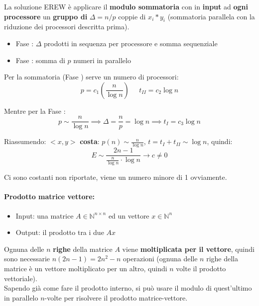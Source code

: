 \documentclass[11pt]{article}
\begin{document}
	La soluzione EREW è applicare il \textbf{modulo sommatoria} con in \textbf{input} ad \textbf{ogni processore} un \textbf{gruppo di} $\Delta = n/p$ coppie di $x_i \ast y_i$ (sommatoria parallela con la riduzione dei processori descritta prima).\\
	
	\begin{itemize}
		\item Fase : $\Delta$ prodotti in sequenza per processore e somma sequenziale
		\item Fase : somma di $p$ numeri in parallelo
	\end{itemize}
	
	Per la sommatoria (Fase ) serve un numero di processori: 
	$$ p = c_1 (\frac{n}{\log n}) \;\;\;\;\; t_{II} = c_2 \log n $$
	
	Mentre per la Fase : 
	$$ p \sim \frac{n}{\log n}  \implies \Delta = \frac{n}{p} = \log n \implies t_{I} = c_3 \log n$$
	
	Riassumendo:
	$<x,y>$ \textbf{costa}: $p(n) \sim \frac{n}{\log n}$, $t = t_{I} + t_{II} \sim \log n$, quindi:
	$$ E \sim \frac{2n-1}{\frac{n}{\log n} \cdot \log n} \rightarrow c \neq 0 $$
	
	Ci sono costanti non riportate, viene un numero minore di 1 ovviamente.\\
	
	\newpage
	
	\paragraph{Prodotto matrice vettore:}
	\begin{itemize}
		\item Input: una matrice $A \in \mathbb{N}^{n \times n}$ ed un vettore $x \in \mathbb{N}^n$
		\item Output: il prodotto tra i due $Ax$ 
	\end{itemize}
	
	Ognuna delle $n$ \textbf{righe} della matrice $A$ viene \textbf{moltiplicata per il vettore}, quindi sono necessarie $n(2n-1) = 2n^2 -n$ operazioni (ognuna delle $n$ righe della matrice è un vettore moltiplicato per un altro, quindi $n$ volte il prodotto vettoriale).\\
	
	Sapendo già come fare il prodotto interno, si può usare il modulo di quest'ultimo in parallelo $n$-volte per risolvere il prodotto matrice-vettore.\\
	
\end{document}
